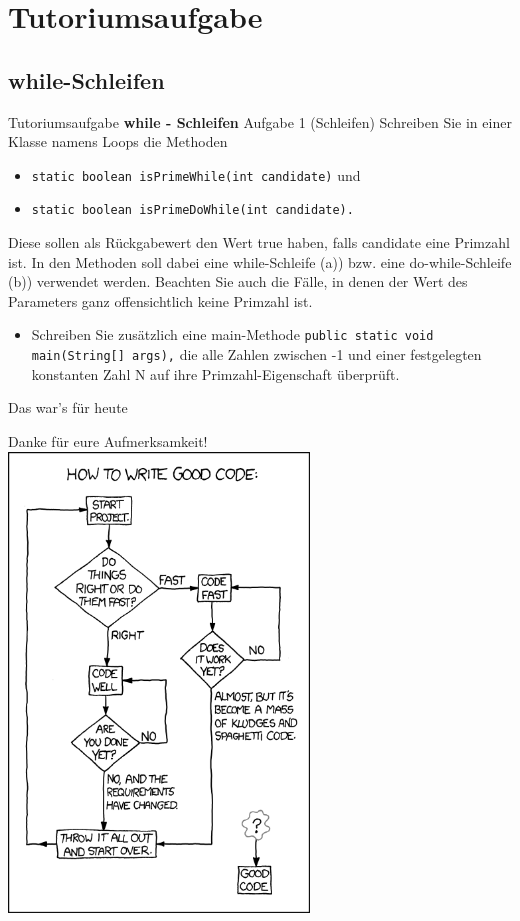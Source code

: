 \documentclass[18pt]{beamer}
\begin{document}
\section{Tutoriumsaufgabe}
\subsection{while-Schleifen}

\begin{frame}[fragile]{Tutoriumsaufgabe}
\textbf{while - Schleifen}
Aufgabe 1 (Schleifen)
Schreiben Sie in einer Klasse namens Loops die Methoden
\begin{itemize}
\item \lstinline{static boolean isPrimeWhile(int candidate)} und
\item \lstinline$static boolean isPrimeDoWhile(int candidate).$
\end{itemize}
\small{Diese sollen als Rückgabewert den Wert true haben, falls candidate eine Primzahl ist. In den
Methoden soll dabei eine while-Schleife (a)) bzw. eine do-while-Schleife (b))
verwendet werden. Beachten Sie auch die Fälle, in denen der Wert des Parameters ganz offensichtlich
keine Primzahl ist.}
\begin{itemize}
\item Schreiben Sie zusätzlich eine main-Methode
\lstinline$public static void main(String[] args),$
die alle Zahlen zwischen -1 und einer festgelegten konstanten Zahl N auf ihre Primzahl-Eigenschaft
überprüft.
\end{itemize}
\end{frame}

\begin{frame}[fragile]{Das war's für heute}
\begin{center}
Danke für eure Aufmerksamkeit!\newline
\includegraphics[width=0.6\textwidth, height= 0.8\textheight]{good_code.png}
\end{center}
\end{frame}
\end{document}
